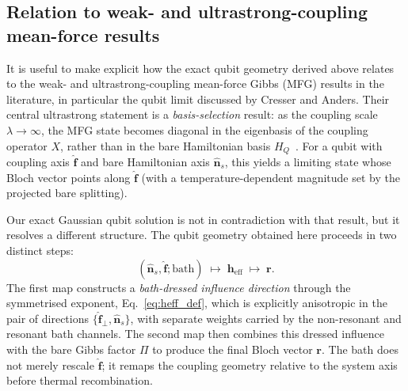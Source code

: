 \subsection{Relation to weak- and ultrastrong-coupling mean-force results}
\label{subsec:qubit_relation_to_limits}

It is useful to make explicit how the exact qubit geometry derived above relates
to the weak- and ultrastrong-coupling mean-force Gibbs (MFG) results in the
literature, in particular the qubit limit discussed by Cresser and Anders.  Their
central ultrastrong statement is a \emph{basis-selection} result: as the coupling
scale $\lambda\to\infty$, the MFG state becomes diagonal in the eigenbasis of
the coupling operator $X$, rather than in the bare Hamiltonian basis
$H_Q$~\cite{cresserWeakUltrastrongCoupling2021a}.  For a qubit with coupling axis $\hat{\mathbf
f}$ and bare Hamiltonian axis $\hat{\mathbf{n}}_s$, this yields a limiting state whose
Bloch vector points along $\hat{\mathbf f}$ (with a temperature-dependent
magnitude set by the projected bare splitting).

Our exact Gaussian qubit solution is not in contradiction with that result, but
it resolves a different structure. The qubit geometry obtained here proceeds in
two distinct steps:
\begin{equation}
(\hat{\mathbf{n}}_s,\hat{\mathbf f};\text{bath}) \;\longmapsto\; \mathbf h_{\mathrm{eff}}
\;\longmapsto\; \mathbf r .
\end{equation}
The first map constructs a \emph{bath-dressed influence direction} through the
symmetrised exponent, Eq.~\eqref{eq:heff_def}, which is explicitly anisotropic
in the pair of directions $\{\hat{\mathbf f}_\perp,\hat{\mathbf{n}}_s\}$, with separate
weights carried by the non-resonant and resonant bath channels.  The second map
then combines this dressed influence with the bare Gibbs factor $\Pi$ to
produce the final Bloch vector $\mathbf r$.  The bath does not merely rescale
$\hat{\mathbf f}$; it remaps the coupling geometry relative to the system axis before
thermal recombination.

